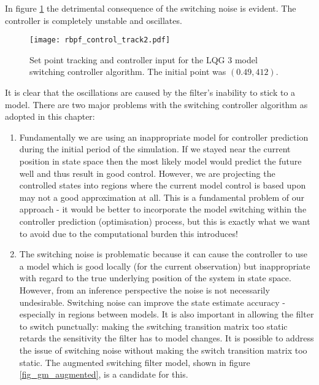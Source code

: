 In figure \ref{fig_rbpf_control_track2} the detrimental consequence of the switching noise is evident. The controller is completely unstable and oscillates.
\begin{figure}[H] 
\centering
\texttt{[image: rbpf\_control\_track2.pdf]}
\caption{Set point tracking and controller input for the LQG 3 model switching controller algorithm. The initial point was $(0.49, 412)$.}
\label{fig_rbpf_control_track2}
\end{figure}
It is clear that the oscillations are caused by the filter's inability to stick to a model. There are two major problems with the switching controller algorithm as adopted in this chapter:
\begin{enumerate}
\item
Fundamentally we are using an inappropriate model for controller prediction during the initial period of the simulation. If we stayed near the current position in state space then the most likely model would predict the future well and thus result in good control. However, we are projecting the controlled states into regions where the current model control is based upon may not a good approximation at all. This is a fundamental problem of our approach - it would be better to incorporate the model switching within the controller prediction (optimisation) process, but this is exactly what we want to avoid due to the computational burden this introduces!
\item
The switching noise is problematic because it can cause the controller to use a model which is good locally (for the current observation) but inappropriate with regard to the true underlying position of the system in state space. However, from an inference perspective the noise is not necessarily undesirable. Switching noise can improve the state estimate accuracy - especially in regions between models. It is also important in allowing the filter to switch punctually: making the switching transition matrix too static retards the sensitivity the filter has to model changes. It is possible to address the issue of switching noise without making the switch transition matrix too static. The augmented switching filter model, shown in figure \ref{fig_gm_augmented}, is a candidate for this.
\begin{figure}[H] 
\centering
{}
\end{figure}
\end{enumerate}
